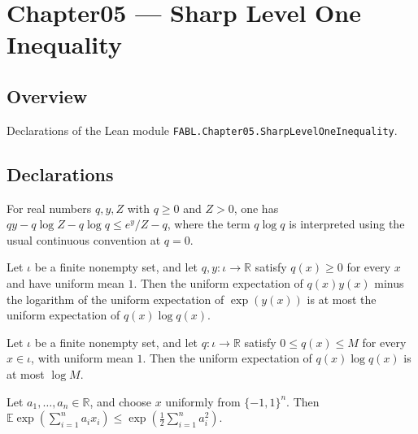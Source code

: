 \chapter{Chapter05 — Sharp Level One Inequality}
\section{Overview}

Declarations of the Lean module \texttt{FABL.Chapter05.SharpLevelOneInequality}.

\section{Declarations}

\begin{theorem}
\label{FABL.gibbs_pointwise}
\leanok
{}
For real numbers $q,y,Z$ with $q\ge 0$ and $Z>0$, one has $qy-q\log Z-q\log q\le
e^y/Z-q$, where the term $q\log q$ is interpreted using the usual continuous convention
at $q=0$.
\end{theorem}

\begin{theorem}
\label{FABL.expect_mul_sub_log_expect_exp_le_entropy}
\leanok
{}
Let $\iota$ be a finite nonempty set, and let $q,y:\iota\to\mathbb R$ satisfy $q(x)\ge
0$ for every $x$ and have uniform mean $1$. Then the uniform expectation of $q(x)y(x)$
minus the logarithm of the uniform expectation of $\exp(y(x))$ is at most the uniform
expectation of $q(x)\log q(x)$.
\end{theorem}

\begin{theorem}
\label{FABL.expect_mul_log_le_log_bound}
\leanok
{}
Let $\iota$ be a finite nonempty set, and let $q:\iota\to\mathbb R$ satisfy $0\le
q(x)\le M$ for every $x\in\iota$, with uniform mean $1$. Then the uniform expectation of
$q(x)\log q(x)$ is at most $\log M$.
\end{theorem}

\begin{theorem}
\label{FABL.expect_exp_linearForm_le}
\leanok
{}
Let $a_1,\ldots,a_n\in\mathbb R$, and choose $x$ uniformly from $\{-1,1\}^n$. Then
$\mathbb E\exp\!\left(\sum_{i=1}^n a_i x_i\right)\leq \exp\!\left(\frac12\sum_{i=1}^n
a_i^2\right)$.
\end{theorem}

